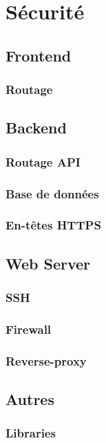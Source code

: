 \section{Sécurité}
\subsection{Frontend}
\subsubsection{Routage}
\subsection{Backend}
\subsubsection{Routage API}
\subsubsection{Base de données}
\subsubsection{En-têtes HTTPS}

\subsection{Web Server}
\subsubsection{SSH}
\subsubsection{Firewall}
\subsubsection{Reverse-proxy}

\subsection{Autres}
\subsubsection{Libraries}

